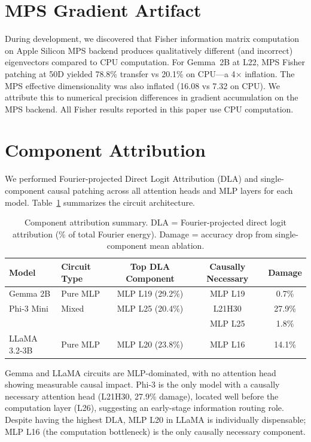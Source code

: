 \appendix

\section{MPS Gradient Artifact}
\label{app:mps}

During development, we discovered that Fisher information matrix computation on Apple Silicon MPS backend produces qualitatively different (and incorrect) eigenvectors compared to CPU computation. For Gemma~2B at L22, MPS Fisher patching at 50D yielded 78.8\% transfer vs 20.1\% on CPU---a 4$\times$ inflation. The MPS effective dimensionality was also inflated (16.08 vs 7.32 on CPU). We attribute this to numerical precision differences in gradient accumulation on the MPS backend. All Fisher results reported in this paper use CPU computation.

\section{Component Attribution}
\label{app:attribution}

We performed Fourier-projected Direct Logit Attribution (DLA) and single-component causal patching across all attention heads and MLP layers for each model. Table~\ref{tab:attribution} summarizes the circuit architecture.

\begin{table}[h]
\centering
\caption{Component attribution summary. DLA = Fourier-projected direct logit attribution (\% of total Fourier energy). Damage = accuracy drop from single-component mean ablation.}
\label{tab:attribution}
\small
\begin{tabular}{llccc}
\toprule
\textbf{Model} & \textbf{Circuit Type} & \textbf{Top DLA Component} & \textbf{Causally Necessary} & \textbf{Damage} \\
\midrule
Gemma 2B & Pure MLP & MLP L19 (29.2\%) & MLP L19 & 0.7\% \\
Phi-3 Mini & Mixed & MLP L25 (20.4\%) & L21H30 & 27.9\% \\
 & & & MLP L25 & 1.8\% \\
LLaMA 3.2-3B & Pure MLP & MLP L20 (23.8\%) & MLP L16 & 14.1\% \\
\bottomrule
\end{tabular}
\end{table}

Gemma and LLaMA circuits are MLP-dominated, with no attention head showing measurable causal impact. Phi-3 is the only model with a causally necessary attention head (L21H30, 27.9\% damage), located well before the computation layer (L26), suggesting an early-stage information routing role. Despite having the highest DLA, MLP L20 in LLaMA is individually dispensable; MLP L16 (the computation bottleneck) is the only causally necessary component.

